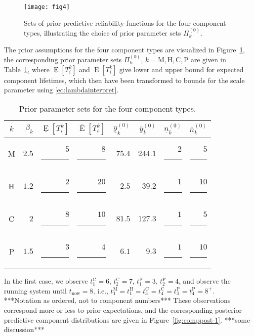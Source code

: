 \documentclass[Journal,SectionNumbers,SingleSpace,InsideFigs]{ascelike}
\newcommand{\uz}{^{(0)}} %
\newcommand{\ul}[1]{\underline{#1}}
\newcommand{\ol}[1]{\overline{#1}}
\newcommand{\El}{\ul{\operatorname{E}}}
\newcommand{\Eu}{\ol{\operatorname{E}}}
\def\ykzl{\ul{y}\uz_k}
\def\ykzu{\ol{y}\uz_k}
\def\nkzl{\ul{n}\uz_k}
\def\nkzu{\ol{n}\uz_k}
\def\PkZ{\Pi\uz_k}
\newcommand{\PZi}[1]{\Pi\uz_{#1}}
\def\tnow{t_\text{now}}
\begin{document}
\begin{figure}
\texttt{[image: fig4]}
\caption{Sets of prior predictive reliability functions for the four component types,
illustrating the choice of prior parameter sets $\PkZ$.}
\label{fig:brake-comppriors}
\end{figure}

The prior assumptions for the four component types are visualized in Figure~\ref{fig:brake-comppriors},
the corresponding prior parameter sets $\PkZ$, $k=\text{M}, \text{H}, \text{C}, \text{P}$
are given in Table~\ref{tab:priorparamsets},
where $\El[T_i^k]$ and $\Eu[T_i^k]$ give lower and upper bound for expected component lifetimes,
which then have been transformed to bounds for the scale parameter using \eqref{eq:lambdainterpret}.

\begin{table}
\centering
\begin{tabular}{crrrrrrr}
  \toprule
$k$ & $\beta_k$ & $\El[T_i^k]$ & $\Eu[T_i^k]$ & $\ykzl$ & $\ykzu$ & $\nkzl$ & $\nkzu$ \\
  \midrule
M & $2.5$ & $5$\rule{1.5ex}{0ex} & $ 8$\rule{1.5ex}{0ex} & $75.4$ & $244.1$ & $2$\rule{1ex}{0ex} & $ 5$\rule{1ex}{0ex} \\
H & $1.2$ & $2$\rule{1.5ex}{0ex} & $20$\rule{1.5ex}{0ex} & $ 2.5$ & $ 39.2$ & $1$\rule{1ex}{0ex} & $10$\rule{1ex}{0ex} \\
C & $2  $ & $8$\rule{1.5ex}{0ex} & $10$\rule{1.5ex}{0ex} & $81.5$ & $127.3$ & $1$\rule{1ex}{0ex} & $ 5$\rule{1ex}{0ex} \\
P & $1.5$ & $3$\rule{1.5ex}{0ex} & $ 4$\rule{1.5ex}{0ex} & $ 6.1$ & $  9.3$ & $1$\rule{1ex}{0ex} & $10$\rule{1ex}{0ex} \\
  \bottomrule
\end{tabular}
\caption{Prior parameter sets for the four component types.}
\label{tab:priorparamsets}
\end{table}

In the first case, we observe $t_1^\text{C} = 6$, $t_2^\text{C} = 7$, $t_1^\text{P} = 3$, $t_2^\text{P} = 4$,
and observe the running system until $\tnow = 8$,
i.e., $t_1^\text{M} = t_1^\text{H} = t_3^\text{C} = t_4^\text{C} = t_3^\text{P} = t_4^\text{P} = 8^+$.
***Notation as ordered, not to component numbers***
These observations correspond more or less to prior expectations,
and the corresponding posterior predictive component distributions are given in Figure~\ref{fig:comppost-1}.
***some discussion***
\end{document}
